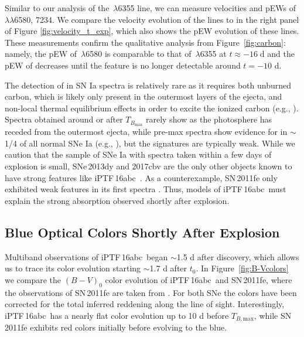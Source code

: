 \documentclass[twocolumn]{aastex61}
\newcommand{\abc}{iPTF\,16abc}
\begin{document}
Similar to our analysis of the \,$\lambda$6355 line, we 
can measure velocities and pEWs of 
\,$\lambda\lambda$6580, 7234. We compare the velocity 
evolution of the  lines to  in the right panel 
of Figure \ref{fig:velocity_t_exp}, which also shows the pEW evolution of these lines. These measurements confirm the qualitative analysis from Figure~\ref{fig:carbon}: namely, the pEW of \,$\lambda$6580 is comparable to that
of \,$\lambda$6355 at $t \approx -16 \; \mathrm{d}$ and 
the pEW of  
decreases until the feature is no longer detectable 
around $t = -10$ d.

The detection of  in SN Ia spectra is relatively rare
as it requires both unburned carbon, which is likely only present in the outermost layers of the ejecta, and non-local thermal equilibrium effects in order to excite the ionized carbon (e.g., \citealt{2007ApJ...654L..53T}). Spectra obtained around or after $T_{B_\mathrm{max}}$ rarely show  as the photosphere has receded from the outermost ejecta, while pre-max spectra show evidence for  in $\sim$1/4 of all normal SNe Ia (e.g., \citealt{2011ApJ...732...30P,2012MNRAS.425.1917S,2011ApJ...743...27T}), but the signatures are typically weak. While we caution that the sample of SNe Ia with spectra taken within a few days of explosion is small, SNe\,2013dy and 2017cbv are the only other objects known to have strong  features like \abc\ \citep{2013ApJ...778L..15Z,2017arXiv170608990H}. As a counterexample, SN\,2011fe only exhibited weak  features in its first spectra
\citep{2012ApJ...752L..26P}. Thus, models of \abc\ must explain the strong  absorption observed shortly after explosion.

\subsection{Blue Optical Colors Shortly After Explosion}

Multiband observations of \abc\ began $\sim$1.5 d after discovery, which allows us to trace its color evolution starting $\sim$1.7 d after $t_0$. In Figure~\ref{fig:B-Vcolors} we compare the $(B - V)_0$ color evolution of \abc\ and SN\,2011fe, where the observations of SN\,2011fe are taken from \citet{2016ApJ...820...67Z}. For both SNe the colors have been corrected for the total inferred reddening along the line of sight. Interestingly, \abc\ has a nearly flat color evolution up to 10 d before $T_{B,\mathrm{max}}$, while SN\,2011fe exhibits red colors initially before evolving to the blue.
\end{document}
